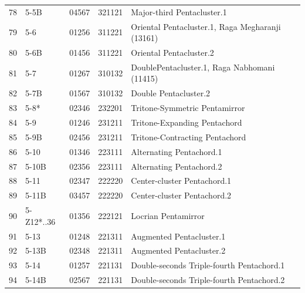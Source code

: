\documentclass[
	12pt,				%
	openright,			%
	twoside,			%
	a4paper,			%
	english,			%
	french,				%
	spanish,			%
	brazil				%
	]{abntex2}
\begin{document}
\begin{anexosenv}
\begin{table}[h]
\begin{tabular}{lllll}
78 & 5-5B                           & 04567 & 321121          & Major-third Pentacluster.1                        \\
79 & 5-6                            & 01256 & 311221          & Oriental Pentacluster.1, Raga Megharanji (13161)  \\
80 & 5-6B                           & 01456 & 311221          & Oriental Pentacluster.2                           \\
81 & 5-7                            & 01267 & 310132          & DoublePentacluster.1, Raga Nabhomani (11415)      \\
82 & 5-7B                           & 01567 & 310132          & Double Pentacluster.2                             \\
83 & 5-8*                           & 02346 & 232201          & Tritone-Symmetric Pentamirror                     \\
84 & 5-9                            & 01246 & 231211          & Tritone-Expanding Pentachord                      \\
85 & 5-9B                           & 02456 & 231211          & Tritone-Contracting Pentachord                    \\
86 & 5-10                           & 01346 & 223111          & Alternating Pentachord.1                          \\
87 & 5-10B                          & 02356 & 223111          & Alternating Pentachord.2                          \\
88 & 5-11                           & 02347 & 222220          & Center-cluster Pentachord.1                       \\
89 & 5-11B                          & 03457 & 222220          & Center-cluster Pentachord.2                       \\
90 & 5-Z12*..36                     & 01356 & 222121          & Locrian Pentamirror                               \\
91 & 5-13                           & 01248 & 221311          & Augmented Pentacluster.1                          \\
92 & 5-13B                          & 02348 & 221311          & Augmented Pentacluster.2                          \\
93 & 5-14                           & 01257 & 221131          & Double-seconds Triple-fourth Pentachord.1         \\
94 & 5-14B                          & 02567 & 221131          & Double-seconds Triple-fourth Pentachord.2         \\

\end{tabular}
\end{table}
\end{anexosenv}
\end{document}
